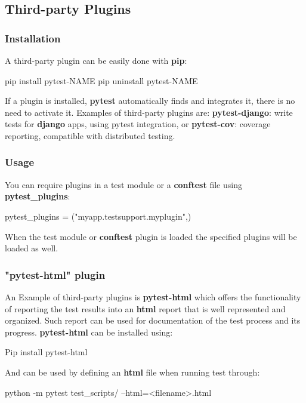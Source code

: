 \newpage
\subsection{Third-party Plugins}

\subsubsection{Installation}
A third-party plugin can be easily done with \textbf{pip}:
\begin{bash}
pip install pytest-NAME
pip uninstall pytest-NAME
\end{bash}
If a plugin is installed, \textbf{pytest} automatically finds and integrates it, there is no need to activate it.
Examples of third-party plugins are: \textbf{pytest-django}: write tests for \textbf{django} apps, using pytest integration, or \textbf{pytest-cov}: coverage reporting, compatible with distributed testing.

\subsubsection{Usage}
You can require plugins in a test module or a \textbf{conftest} file using \textbf{pytest\_plugins}:
\begin{python}
pytest_plugins = ("myapp.testsupport.myplugin",)
\end{python}
When the test module or \textbf{conftest} plugin is loaded the specified plugins will be loaded as well.

\subsubsection{"pytest-html" plugin}
An Example of third-party plugins is \textbf{pytest-html} which offers the functionality of reporting the test results into an \textbf{html} report that is well represented and organized. Such report can be used for documentation of the test process and its progress.
\textbf{pytest-html} can be installed using:
\begin{bash}
Pip install pytest-html
\end{bash}
And can be used by defining an \textbf{html} file when running test through:
\begin{bash}
python -m pytest test_scripts/ --html=<filename>.html
\end{bash}
